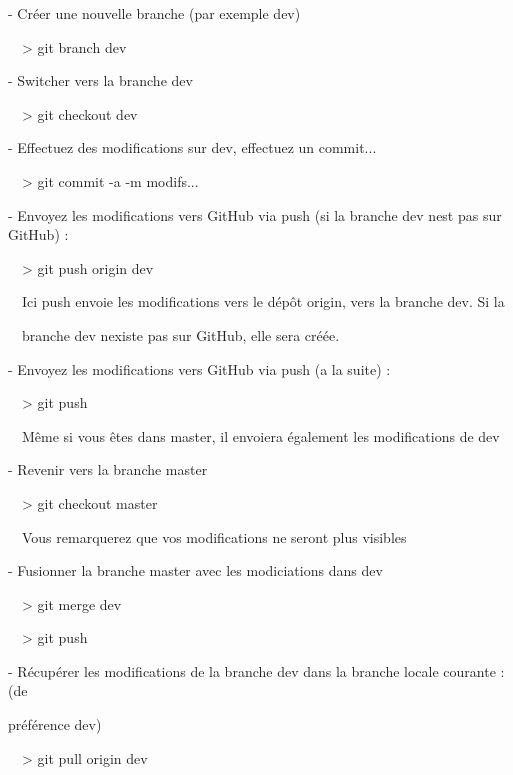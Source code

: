 \documentclass{mise_en_page}
\begin{document}
 {}- Créer une nouvelle branche (par exemple
{\textquotedbl}dev{\textquotedbl})

\ \ {\textgreater} git branch dev




 {}- Switcher vers la branche {\textquotedbl}dev{\textquotedbl}

\ \ {\textgreater} git checkout dev




 {}- Effectuez des modifications sur {\textquotedbl}dev{\textquotedbl},
effectuez un commit...

\ \ {\textgreater} git commit -a -m
{\textquotedbl}modifs...{\textquotedbl}




 {}- Envoyez les modifications vers GitHub via push (si la branche
{\textquotedbl}dev{\textquotedbl} n{\textquotesingle}est pas sur
GitHub) :

\ \ {\textgreater} git push origin dev

\ \ Ici push envoie les modifications vers le dépôt origin, vers la
branche {\textquotedbl}dev{\textquotedbl}. Si la

\ \ branche dev n{\textquotesingle}existe pas sur GitHub, elle sera
créée.




 {}- Envoyez les modifications vers GitHub via push (a la suite) :

\ \ {\textgreater} git push

\ \ Même si vous êtes dans master, il envoiera également les
modifications de {\textquotedbl}dev{\textquotedbl}




 {}- Revenir vers la branche master

\ \ {\textgreater} git checkout master

\ \ Vous remarquerez que vos modifications ne seront plus visibles




 {}- Fusionner la branche master avec les modiciations dans
{\textquotedbl}dev{\textquotedbl}

\ \ {\textgreater} git merge dev

\ \ {\textgreater} git push




 {}- Récupérer les modifications de la branche
{\textquotedbl}dev{\textquotedbl} dans la branche locale courante : (de

 préférence {\textquotedbl}dev{\textquotedbl})

\ \ {\textgreater} git pull origin dev
\end{document}
